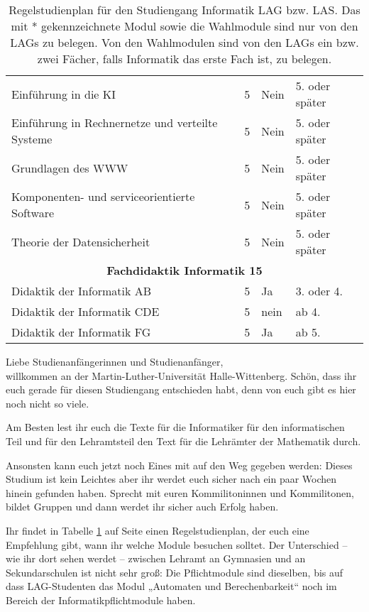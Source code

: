 \begin{table}[tbp]
\begin{footnotesize}
\begin{tabularx}{\textwidth}{|b{}|X|X|X|}
        Einführung in die KI                             & 5 & Nein & 5. oder später \\
        Einführung in Rechnernetze und verteilte Systeme & 5 & Nein & 5. oder später \\
        Grundlagen des WWW                               & 5 & Nein & 5. oder später \\
        Komponenten- und serviceorientierte Software     & 5 & Nein & 5. oder später \\
        Theorie der Datensicherheit                      & 5 & Nein & 5. oder später \\
        \hline
        \multicolumn{4}{|c|}{\textbf{Fachdidaktik Informatik 15}}\\\hline
        Didaktik der Informatik AB  & 5 & Ja   & 3. oder 4. \\
        Didaktik der Informatik CDE & 5 & nein & ab 4. \\
        Didaktik der Informatik FG  & 5 & Ja   & ab 5. \\
        \hline
    \end{tabularx}
    \end{footnotesize}
    \caption{\label{plan-laI}Regelstudienplan für den Studiengang Informatik LAG bzw. LAS. Das mit * gekennzeichnete Modul sowie die Wahlmodule sind nur von den LAGs zu belegen. Von den Wahlmodulen sind von den LAGs ein bzw. zwei Fächer, falls Informatik das erste Fach ist, zu belegen.}
\end{table}

Liebe Studienanfängerinnen und Studienanfänger,\\
willkommen an der Martin-Luther-Universität Halle-Wittenberg.
Schön, dass ihr euch gerade für diesen Studiengang entschieden habt, denn von euch gibt es hier noch nicht so viele.

Am Besten lest ihr euch die Texte für die Informatiker für den informatischen Teil und für den Lehramtsteil den Text für die Lehrämter der Mathematik durch.

Ansonsten kann euch jetzt noch Eines mit auf den Weg gegeben werden:
Dieses Studium ist kein Leichtes aber ihr werdet euch sicher nach ein paar Wochen hinein gefunden haben.
Sprecht mit euren Kommilitoninnen und Kommilitonen, bildet Gruppen und dann werdet ihr sicher auch Erfolg haben.

Ihr findet in Tabelle \ref{plan-laI} auf Seite \pageref{plan-laI} einen Regelstudienplan, der euch eine Empfehlung gibt, wann ihr welche Module besuchen solltet.
Der Unterschied  -- wie ihr dort sehen werdet -- zwischen Lehramt an Gymnasien und an Sekundarschulen ist nicht sehr groß:
Die Pflichtmodule sind dieselben, bis auf dass LAG-Studenten das Modul „Automaten und Berechenbarkeit“ noch im Bereich der Informatikpflichtmodule haben.

